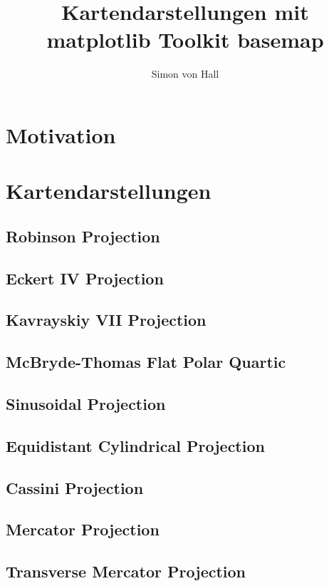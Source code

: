 \documentclass[a4paper,10pt]{article}
\title{Kartendarstellungen mit\\matplotlib Toolkit basemap}
\author{Simon von Hall}
\date{}
\begin{document}
\maketitle
\clearpage
\tableofcontents
\section{Motivation}
\label{sec:1}
\section{Kartendarstellungen}
\label{sec:2}
 






\subsection{Robinson Projection}
\label{sec:2.8}
\subsection{Eckert IV Projection}
\label{sec:2.9}
\subsection{Kavrayskiy VII Projection}
\label{sec:2.10}
\subsection{McBryde-Thomas Flat Polar Quartic}
\label{sec:2.11}
\subsection{Sinusoidal Projection}
\label{sec:2.12}
\subsection{Equidistant Cylindrical Projection}
\label{sec:2.13}
\subsection{Cassini Projection}
\label{sec:2.14}
\subsection{Mercator Projection}
\label{sec:2.15}
\subsection{Transverse Mercator Projection}
\label{sec:2.16}
\end{document}
